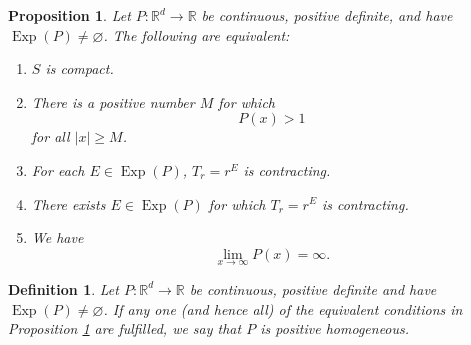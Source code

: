 \documentclass[11pt]{article}
\newtheorem{definition}[theorem]{Definition}
\newtheorem{proposition}[theorem]{Proposition}
\theoremstyle{remark}
\newcommand\Exp{\operatorname{Exp}}
\begin{document}
\begin{proposition}\label{prop:PositiveHomogeneousCharacterization}
Let $P:\mathbb{R}^d\to\mathbb{R}$ be continuous, positive definite, and have $\Exp(P)\neq \varnothing$. The following are equivalent:
\begin{enumerate}[label=(\alph*), ref=(\alph*)]
\item\label{cond:SisCompact} $S$ is compact.
\item\label{cond:PisAboveOne} There is a positive number $M$ for which
\begin{equation*}
P(x)>1
\end{equation*}
for all $|x|\geq M$. 
\item\label{cond:Contracting} For each $E\in\Exp(P)$, $T_r=r^E$ is contracting.
\item\label{cond:ThereExistsContracting} There exists $E\in\Exp(P)$ for which $T_r=r^E$ is contracting.
\item\label{cond:InfiniteLimit} We have
\begin{equation*}
\lim_{x\to\infty}P(x)=\infty.
\end{equation*}
\end{enumerate}
\end{proposition}



\begin{definition}
Let $P:\mathbb{R}^d\to\mathbb{R}$ be continuous, positive definite and have $\Exp(P)\neq \varnothing$. If any one (and hence all) of the equivalent conditions in Proposition \ref{prop:PositiveHomogeneousCharacterization} are fulfilled, we say that $P$ is positive homogeneous.
\end{definition}
\end{document}
